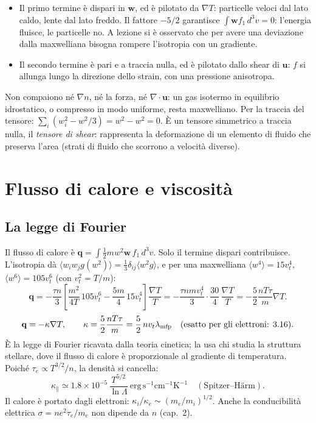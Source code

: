\begin{itemize}
\item Il primo termine è dispari in $\mathbf{w}$, ed è pilotato da $\nabla T$: particelle veloci dal lato caldo, lente dal lato freddo. Il fattore $-5/2$ garantisce $\int\mathbf{w}f_1\,d^3v=0$: l'energia fluisce, le particelle no. A lezione si è osservato che per avere una deviazione dalla maxwelliana bisogna rompere l'isotropia con un gradiente.
\item Il secondo termine è pari e a traccia nulla, ed è pilotato dallo shear di $\mathbf{u}$: $f$ si allunga lungo la direzione dello strain, con una pressione anisotropa.
\end{itemize}
Non compaiono né $\nabla n$, né la forza, né $\nabla\cdot\mathbf{u}$: un gas isotermo in equilibrio idrostatico, o compresso in modo uniforme, resta maxwelliano.
Per la traccia del tensore: $\sum_i\left(w_i^2-w^2/3\right)=w^2-w^2=0$. È un tensore simmetrico a traccia nulla, il \emph{tensore di shear}: rappresenta la deformazione di un elemento di fluido che preserva l'area (strati di fluido che scorrono a velocità diverse).

\section{Flusso di calore e viscosità}
\subsection{La legge di Fourier}
Il flusso di calore è $\mathbf{q}=\int\frac12mw^2\mathbf{w}\,f_1\,d^3v$. Solo il termine dispari contribuisce. L'isotropia dà $\langle w_iw_jg(w^2)\rangle=\frac13\delta_{ij}\langle w^2g\rangle$, e per una maxwelliana $\langle w^4\rangle=15v_t^4$, $\langle w^6\rangle=105v_t^6$ (con $v_t^2=T/m$):
\begin{equation}
\mathbf{q}=-\frac{\tau n}{3}\left[\frac{m^2}{4T}\,105v_t^6-\frac{5m}{4}\,15v_t^4\right]\frac{\nabla T}{T}=-\frac{\tau nmv_t^4}{3}\cdot\frac{30}{4}\,\frac{\nabla T}{T}=-\frac52\frac{nT\tau}{m}\nabla T .
\end{equation}
\begin{equation}
\mathbf{q}=-\kappa\nabla T,\qquad\kappa=\frac52\frac{nT\tau}{m}=\frac52\,nv_t\lambda_{\rm mfp}\quad(\text{esatto per gli elettroni: }3.16).
\end{equation}
È la legge di Fourier ricavata dalla teoria cinetica; la usa chi studia la struttura stellare, dove il flusso di calore è proporzionale al gradiente di temperatura. Poiché $\tau_e\propto T^{3/2}/n$, la densità si cancella:
\begin{equation}
\kappa_\parallel\simeq1.8\times10^{-5}\,\frac{T^{5/2}}{\ln\Lambda}\ \mathrm{erg\,s^{-1}cm^{-1}K^{-1}}\quad(\text{Spitzer--H\"arm}).
\end{equation}
Il calore è portato dagli elettroni: $\kappa_i/\kappa_e\sim(m_e/m_i)^{1/2}$. Anche la conducibilità elettrica $\sigma=ne^2\tau_e/m_e$ non dipende da $n$ (cap.~2).

